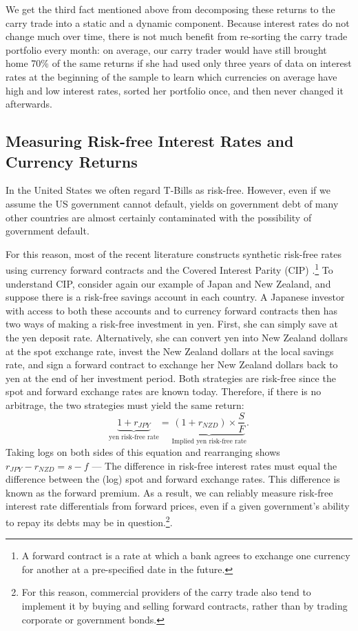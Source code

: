 \documentclass{ar-1col}
\begin{document}
We get the third fact mentioned above from decomposing these returns to the carry trade into a static and a dynamic component. Because interest rates do not change much over time, there is not much benefit from re-sorting the carry trade portfolio every month: on average, our carry trader would have still brought home 70\% of the same returns if she had used only three years of data on interest rates at the beginning of the sample to learn which currencies on average have high and low interest rates, sorted her portfolio once, and then never changed it afterwards.

\begin{textbox}[]\section{Measuring Risk-free Interest Rates and Currency Returns}
 In the United States we often regard T-Bills as risk-free. However, even if we assume the US government cannot default, yields on government debt of many other countries are almost certainly contaminated with the possibility of government default.

    For this reason, most of the recent literature constructs synthetic risk-free rates using currency forward contracts and the Covered Interest Parity (CIP) \citep{LustigRoussanovVerdelhan2011, DuSchreger2016}.\footnote{A forward contract is a rate at which a bank agrees to exchange one currency for another at a pre-specified date in the future.} To understand CIP, consider again our example of Japan and New Zealand, and suppose there is a risk-free savings account in each country. A Japanese investor with access to both these accounts and to currency forward contracts then has two ways of making a risk-free investment in yen. First, she can simply save at the yen deposit rate. Alternatively, she can convert yen into New Zealand dollars at the spot exchange rate, invest the New Zealand dollars at the local savings rate, and sign a forward contract to exchange her New Zealand dollars back to yen at the end of her investment period. Both strategies are risk-free since the spot and forward exchange rates are known today. Therefore, if there is no arbitrage, the two strategies must yield the same return:
    \begin{equation}
    \underbrace{1 + r_{JPY}}_{\text{yen risk-free rate}}
    = \underbrace{
        (1 + r_{NZD}) \times \frac{S}{F}
    }_{\text{Implied yen risk-free rate}}.
    \end{equation}
    Taking logs on both sides of this equation and rearranging shows $r_{JPY}-r_{NZD}=s-f$ --- The difference in risk-free interest rates must equal the difference between the (log) spot and forward exchange rates. This difference is known as the forward premium. As a result, we can reliably measure risk-free interest rate differentials from forward prices, even if a given government's ability to repay its debts may be in question.\footnote{For this reason, commercial providers of the carry trade also tend to implement it by buying and selling forward contracts, rather than by trading corporate or government bonds.}.
\end{textbox}
\end{document}
